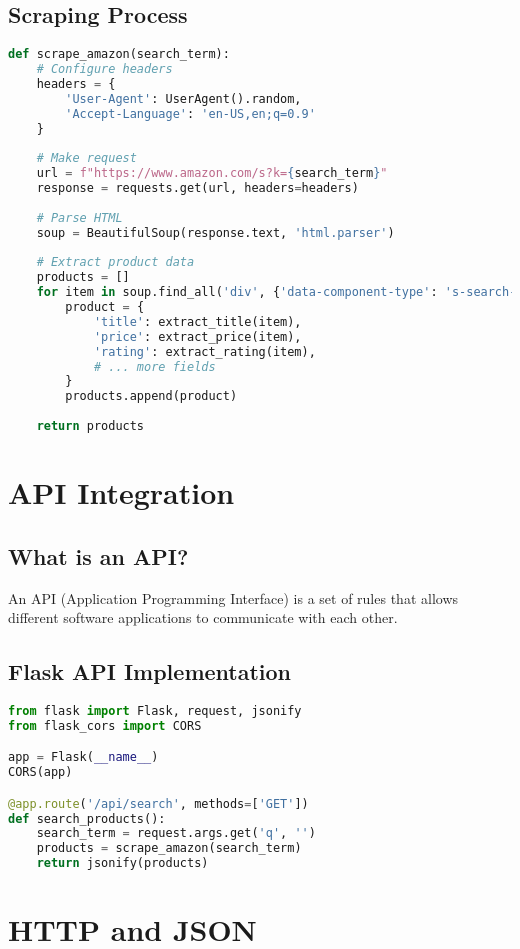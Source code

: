 \documentclass[12pt,a4paper]{article}
\begin{document}
\subsection{Scraping Process}
\begin{lstlisting}[language=Python]
def scrape_amazon(search_term):
    # Configure headers
    headers = {
        'User-Agent': UserAgent().random,
        'Accept-Language': 'en-US,en;q=0.9'
    }
    
    # Make request
    url = f"https://www.amazon.com/s?k={search_term}"
    response = requests.get(url, headers=headers)
    
    # Parse HTML
    soup = BeautifulSoup(response.text, 'html.parser')
    
    # Extract product data
    products = []
    for item in soup.find_all('div', {'data-component-type': 's-search-result'}):
        product = {
            'title': extract_title(item),
            'price': extract_price(item),
            'rating': extract_rating(item),
            # ... more fields
        }
        products.append(product)
    
    return products
\end{lstlisting}

\section{API Integration}
\subsection{What is an API?}
An API (Application Programming Interface) is a set of rules that allows different software applications to communicate with each other.

\subsection{Flask API Implementation}
\begin{lstlisting}[language=Python]
from flask import Flask, request, jsonify
from flask_cors import CORS

app = Flask(__name__)
CORS(app)

@app.route('/api/search', methods=['GET'])
def search_products():
    search_term = request.args.get('q', '')
    products = scrape_amazon(search_term)
    return jsonify(products)
\end{lstlisting}

\section{HTTP and JSON}
\end{document}
